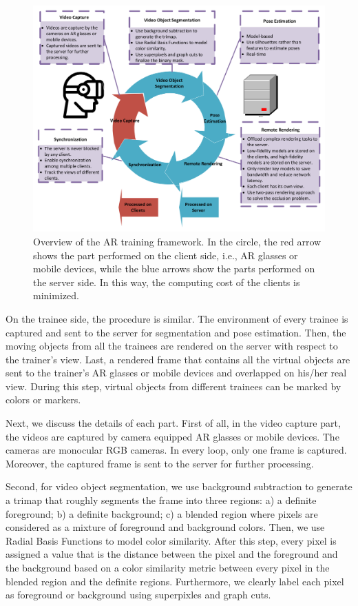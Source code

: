 \begin{figure}[!htbp]
	\centering
	\includegraphics[width=\textwidth]{figures/AR-training-overview.pdf}
	\caption{Overview of the AR training framework. In the circle, the red arrow shows the part performed on the client side, i.e., AR glasses or mobile devices, while the blue arrows show the parts performed on the server side. In this way, the computing cost of the clients is minimized.}
	\label{fig:ar-training-overview}
\end{figure}

On the trainee side, the procedure is similar.
The environment of every trainee is captured and sent to the server for segmentation and pose estimation.
Then, the moving objects from all the trainees are rendered on the server with respect to the trainer's view.
Last, a rendered frame that contains all the virtual objects are sent to the trainer's AR glasses or mobile devices and overlapped on his/her real view. During this step, virtual objects from different trainees can be marked by colors or markers.

Next, we discuss the details of each part.
First of all, in the video capture part, the videos are captured by camera equipped AR glasses or mobile devices.
The cameras are monocular RGB cameras. In every loop, only one frame is captured.
Moreover, the captured frame is sent to the server for further processing.

Second, for video object segmentation, we use background subtraction to generate a trimap that  roughly segments the frame into three regions: a) a definite foreground; b) a definite background; c) a blended region where pixels are considered as a mixture of foreground and background colors.
Then, we use Radial Basis Functions to model color similarity. After this step, every pixel is assigned a value that is the distance between the pixel and the foreground and the background based on a color similarity metric between every pixel in the blended region and the definite regions.
Furthermore, we clearly label each pixel as foreground or background using superpixles and graph cuts.

